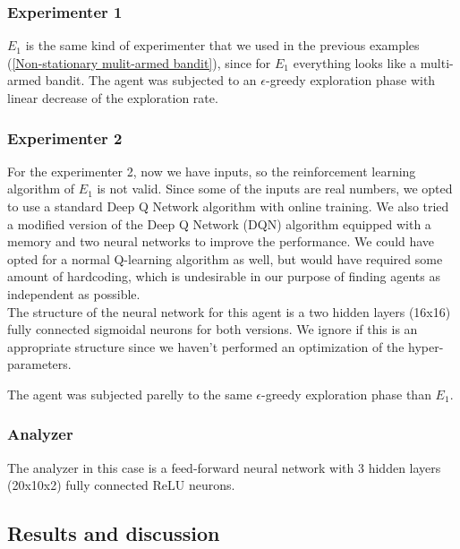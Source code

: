 \documentclass[11pt,a4paper,twoside]{report}
\newcommand{\+}{\textnormal{+} }
\theoremstyle{definition}
\numberwithin{equation}{chapter}
\begin{document}
\subsubsection{Experimenter 1}
$E_1$ is the same kind of experimenter that we used in the previous examples
(\ref{Non-stationary mulit-armed bandit}), since for $E_1$ everything looks like
a multi-armed bandit. The agent was subjected to an $\epsilon$-greedy 
exploration phase with linear decrease of the exploration rate.
\subsubsection{Experimenter 2}
For the experimenter 2, now we have inputs, so the reinforcement learning
algorithm of $E_1$ is not valid. Since some of the inputs are real numbers, we
opted to use a standard Deep Q Network \cite{sutton2018reinforcement} algorithm
with online training. We also tried a modified version of the Deep Q Network
(DQN) algorithm equipped with a memory and two neural networks
\cite{mnih2015human} to improve the performance. We could have opted for a
normal Q-learning algorithm as well, but would have required some amount of
hardcoding, which is undesirable in our purpose of finding agents as independent
as possible. \\
\noindent The structure of the neural network for this agent is a two hidden layers  
(16x16) fully connected sigmoidal neurons for both versions. We ignore if this 
is an appropriate structure since we haven't performed an optimization of the
hyper-parameters.

\noindent The agent was subjected parelly to the same $\epsilon$-greedy
exploration phase than $E_1$.

\subsubsection{Analyzer}

The analyzer in this case is a feed-forward neural network with 
3 hidden layers (20x10x2) fully connected ReLU neurons.
\subsection{Results and discussion}
\end{document}
